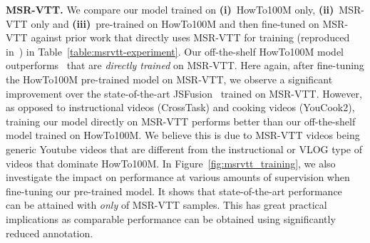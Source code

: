 \documentclass[10pt,twocolumn,letterpaper]{article}
\begin{document}
{\bf \noindent MSR-VTT.}
We compare our model trained on \textbf{(i)}~HowTo100M only, \textbf{(ii)}~MSR-VTT only and \textbf{(iii)}~pre-trained on HowTo100M and then fine-tuned on MSR-VTT against prior work that directly uses MSR-VTT for training (reproduced in~\cite{yu18joint}) in Table~\ref{table:msrvtt-experiment}.
Our off-the-shelf HowTo100M model outperforms~\cite{kaufman17temporal,kiros14unifying,torabi16learning,yu16videocaptioning,yu17endtoend} that are \textit{directly trained} on MSR-VTT.
Here again, after fine-tuning the HowTo100M pre-trained model on MSR-VTT, we observe a significant improvement over the state-of-the-art JSFusion~\cite{yu18joint} trained on MSR-VTT.
However, as opposed to instructional videos (CrossTask) and cooking videos (YouCook2), training our model directly on MSR-VTT performs better than our off-the-shelf model trained on HowTo100M. 
We believe this is due to MSR-VTT videos being generic Youtube videos that are different from the instructional or VLOG type of videos that dominate HowTo100M. 
In Figure~\ref{fig:msrvtt_training}, we also investigate the impact on performance at various amounts of supervision when fine-tuning our pre-trained model. 
It shows that state-of-the-art performance~\cite{yu18joint} can be attained with \emph{only}  of MSR-VTT samples.
This has great practical implications as comparable performance can be obtained using significantly reduced annotation.
\end{document}
